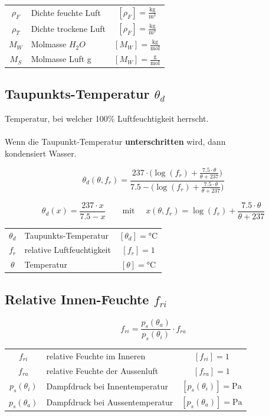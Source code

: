 \begin{tabular}{c l c}
	\rule{0pt}{10pt}$\rho_F$ & Dichte feuchte Luft & $[\rho_F] = \mathrm{\frac{kg}{m^3}}$ \\
	\rule{0pt}{10pt}$\rho_T$ & Dichte trockene Luft & $[\rho_F] = \mathrm{\frac{kg}{m^3}}$ \\
	\rule{0pt}{10pt}$M_W$ & Molmasse $H_2O$ & $[M_W] = \mathrm{\frac{kg}{mol}}$ \\
	\rule{0pt}{10pt}$M_S$ & Molmasse Luft g & $[M_W] = \mathrm{\frac{g}{mol}}$ \\	
\end{tabular}



\subsection{Taupunkts-Temperatur $\theta_d$}
Temperatur, bei welcher 100\% Luftfeuchtigkeit herrscht. \\
\\
Wenn die Taupunkt-Temperatur \textbf{unterschritten} wird, dann \\
kondensiert Wasser.

$$ \boxed{ \theta_d (\theta, f_r) = \frac{237 \cdot \Big( \log(f_r) + \frac{7.5 \cdot \theta}{\theta + 237}    \Big)}{7.5 - \Big( \log(f_r) + \frac{7.5 \cdot \theta }{\theta + 237} \Big) }  }$$


$$ \boxed{ \theta_d (x) = \frac{237 \cdot x}{7.5 - x}    \qquad  \text{mit } \quad    x(\theta, f_r) = \log(f_r) + \frac{7.5 \cdot \theta}{\theta + 237}  }   $$


\begin{tabular}{c l c}
	$\theta_d$ & Taupunkts-Temperatur & $[\theta_d] = \text{°C}$ \\
	$f_r$ & relative Luftfeuchtigkeit & $[f_r] = 1$ \\
	$\theta$ & Temperatur & $[\theta] = \text{°C}$ \\
\end{tabular}




\subsection{Relative Innen-Feuchte $f_{ri}$}

$$ \boxed{ f_{ri} = \frac{p_s(\theta_a)}{p_s(\theta_i)} \cdot f_{ra}  }$$

\begin{tabular}{c l c}
	$f_{ri}$ & relative Feuchte im Inneren & $[f_{ri}] = 1$ \\
	$f_{ra}$ & relative Feuchte der Aussenluft & $[f_{ra}] = \text{1}$ \\
	$p_s(\theta_i)$ & Dampfdruck bei Innentemperatur & $[p_s(\theta_i)] = \mathrm{Pa}$ \\
	$p_s(\theta_a)$ & Dampfdruck bei Aussentemperatur &  $[p_s(\theta_a)] = \mathrm{Pa}$  \\
\end{tabular}



